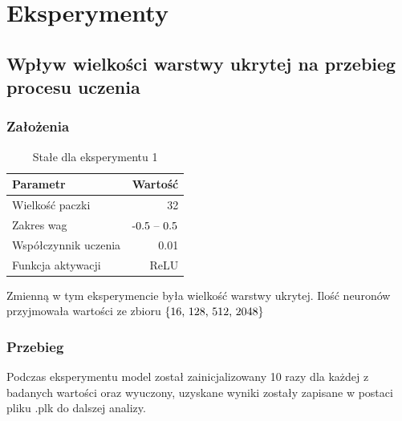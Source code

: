 \documentclass{article}
\begin{document}
\newpage
\section{Eksperymenty}

\subsection{Wpływ wielkości warstwy ukrytej na przebieg procesu uczenia}
\subsubsection*{Założenia}
\begin{table}[H]
	\caption{Stałe dla eksperymentu 1}
	\label{tabela-const-1}
	\centering
	\begin{tabular}{lr}
		\toprule
		Parametr               & Wartość         \\
		\midrule
		Wielkość paczki      & 32                \\
		Zakres wag             & \($-0.5 -- 0.5$\) \\
		Współczynnik uczenia & 0.01              \\
		Funkcja aktywacji      & ReLU              \\
		\bottomrule
	\end{tabular}
\end{table}

Zmienną w tym eksperymencie była wielkość warstwy ukrytej. Ilość neuronów przyjmowała wartości ze zbioru \(\{$16, 128, 512, 2048$\}\)
\subsubsection*{Przebieg}

Podczas eksperymentu model został zainicjalizowany 10 razy dla każdej z badanych wartości oraz wyuczony, uzyskane wyniki zostały zapisane w postaci pliku .plk do dalszej analizy.
\end{document}
